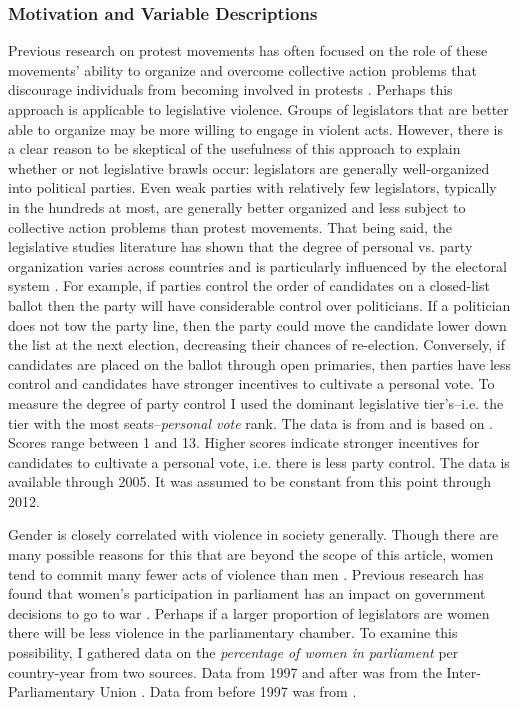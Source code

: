 \documentclass[a4paper]{article}\usepackage[]{graphicx}\usepackage[]{color}
\begin{document}
\subsubsection*{Motivation and Variable Descriptions}


Previous research on protest movements has often focused on the role of these movements' ability to organize and overcome collective action problems that discourage individuals from becoming involved in protests \citep{lohmann1994,tucker2007}. Perhaps this approach is applicable to legislative violence. Groups of legislators that are better able to organize may be more willing to engage in violent acts. However, there is a clear reason to be skeptical of the usefulness of this approach to explain whether or not legislative brawls occur: legislators are generally well-organized into political parties. Even weak parties with relatively few legislators, typically in the hundreds at most, are generally better organized and less subject to collective action problems than protest movements. That being said, the legislative studies literature has shown that the degree of personal vs. party organization varies across countries and is particularly influenced by the electoral system \citep{carey1995}. For example, if parties control the order of candidates on a closed-list ballot then the party will have considerable control over politicians. If a politician does not tow the party line, then the party could move the candidate lower down the list at the next election, decreasing their chances of re-election. Conversely, if candidates are placed on the ballot through open primaries, then parties have less control and candidates have stronger incentives to cultivate a personal vote. To measure the degree of party control I used the dominant legislative tier's--i.e. the tier with the most seats--\emph{personal vote} rank. The data is from \cite{johnson2012} and is based on \cite{carey1995}. Scores range between 1 and 13. Higher scores indicate stronger incentives for candidates to cultivate a personal vote, i.e. there is less party control. The data is available through 2005. It was assumed to be constant from this point through 2012.

Gender is closely correlated with violence in society generally. Though there are many possible reasons for this that are beyond the scope of this article, women tend to commit many fewer acts of violence than men \citep[]{Schwartz2009}. Previous research has found that women's participation in parliament has an impact on government decisions to go to war \citep{Melander2005}. Perhaps if a larger proportion of legislators are women there will be less violence in the parliamentary chamber. To examine this possibility, I gathered data on the \emph{percentage of women in parliament} per country-year from two sources. Data from 1997 and after was from the Inter-Parliamentary Union \citeyearpar{IPU2013}. Data from before 1997 was from \cite{Schwartz2009}.
\end{document}
